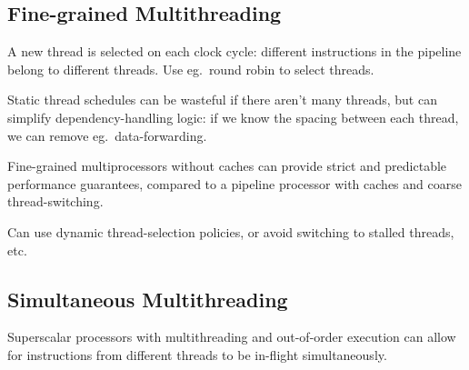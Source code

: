 \documentclass[a4paper,11pt]{article}
\begin{document}
{    \subsection*{Fine-grained Multithreading}
    {
        A new thread is selected on each clock cycle: different instructions in the pipeline belong to different threads. Use eg.\ round robin to select threads.

        Static thread schedules can be wasteful if there aren't many threads, but can simplify dependency-handling logic: if we know the spacing between each thread, we can remove eg.\ data-forwarding.

        Fine-grained multiprocessors without caches can provide strict and predictable performance guarantees, compared to a pipeline processor with caches and coarse thread-switching.

        Can use dynamic thread-selection policies, or avoid switching to stalled threads, etc.
    }
    \subsection*{Simultaneous Multithreading}
    {
        Superscalar processors with multithreading and out-of-order execution can allow for instructions from different threads to be in-flight simultaneously.
    }
}
\end{document}

